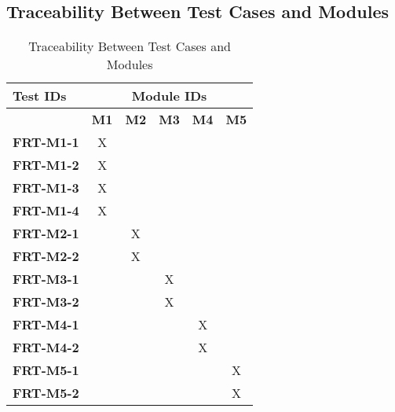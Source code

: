\documentclass[12pt, titlepage]{article}
\begin{document}
\subsection{Traceability Between Test Cases and Modules}

\begin{longtable}{|l|ccccc|}
	\caption{Traceability Between Test Cases and Modules}                                                                                             \\
	\hline
	\textbf{Test IDs}  & \multicolumn{5}{c|}{\textbf{Module IDs}}                                                                                     \\
	\hline
	~                  & \textbf{M1}                              & \textbf{M2} & \textbf{M3} & \textbf{M4} & \textbf{M5} \\
	\hline
	\textbf{FRT-M1-1}  & X                                        & ~           & ~           & ~           & ~ \\
	\textbf{FRT-M1-2}  & X                                        & ~           & ~           & ~           & ~ \\
	\textbf{FRT-M1-3}  & X                                        & ~           & ~           & ~           & ~\\
	\textbf{FRT-M1-4}  & X                                        & ~           & ~           & ~           & ~\\
	\textbf{FRT-M2-1}  & ~                                        & X           & ~           & ~           & ~ \\
	\textbf{FRT-M2-2}  & ~                                        & X           & ~           & ~           & ~\\
	\textbf{FRT-M3-1}  & ~                                        & ~           & X           & ~           & ~\\
	\textbf{FRT-M3-2}  & ~                                        & ~           & X           & ~           & ~\\
	\textbf{FRT-M4-1}  & ~                                        & ~           & ~           & X           & ~\\
	\textbf{FRT-M4-2} & ~                                        & ~           & ~           & X           & ~\\
	\textbf{FRT-M5-1}  & ~                                        & ~           & ~           & ~           & X\\
	\textbf{FRT-M5-2}  & ~                                        & ~           & ~           & ~           &X\\
	\hline
\end{longtable}
				
\end{document}
